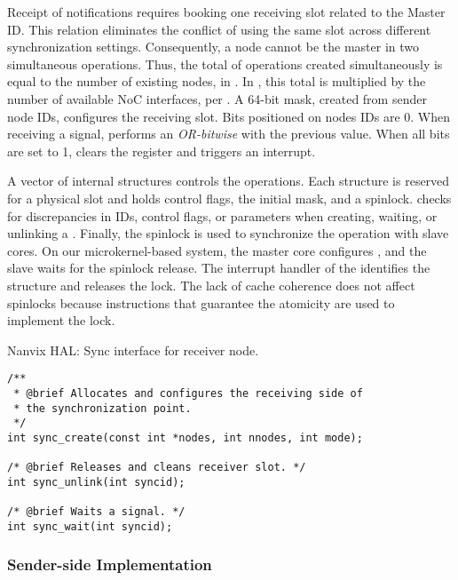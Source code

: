 				Receipt of notifications requires booking one \cnoc receiving slot
				related to the Master ID. This relation eliminates the conflict of
				using the same slot across different synchronization settings.
				Consequently, a node cannot be the master in two simultaneous operations.
				Thus, the total of \sync operations created simultaneously is equal to the number
				of existing nodes,  in \mppa. In \ioclusters, this total is
				multiplied by the number of available NoC interfaces,  per \dma.
				A 64-bit mask, created from sender node IDs, configures the receiving
				slot. Bits positioned on nodes IDs are 0. When receiving a signal,
				\dma performs an \textit{OR-bitwise} with the previous value. When
				all bits are set to 1, \dma clears the register and triggers an interrupt.

				A vector of internal structures controls the operations. Each structure
				is reserved for a physical slot and holds control flags, the initial mask,
				and a spinlock. \hal checks for discrepancies in IDs, control flags, or
				parameters when creating, waiting, or unlinking a \sync. Finally,
				the spinlock is used to synchronize the operation with slave cores.
				On our microkernel-based system, the master core configures \sync, and
				the slave waits for the spinlock release. The interrupt handler of the
				\sync identifies the structure and releases the lock. The lack of cache
				coherence does not affect spinlocks because instructions that guarantee
				the atomicity are used to implement the lock.

\begin{listing}[!b]
\caption{Nanvix HAL: Sync interface for receiver node.}
\label{code:hal-sync-receiver}
\begin{verbatim}
/**
 * @brief Allocates and configures the receiving side of
 * the synchronization point.
 */
int sync_create(const int *nodes, int nnodes, int mode);

/* @brief Releases and cleans receiver slot. */
int sync_unlink(int syncid);

/* @brief Waits a signal. */
int sync_wait(int syncid);
\end{verbatim}
\end{listing}

			\subsubsection{Sender-side Implementation}

